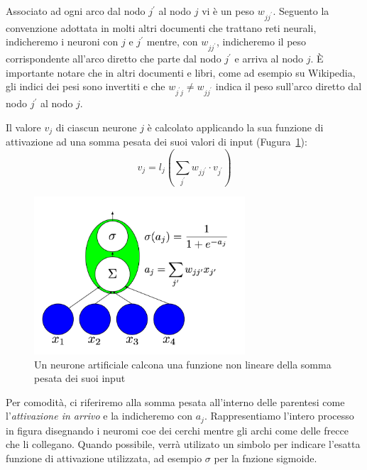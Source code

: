 Associato ad ogni arco dal nodo $j^{'}$ al nodo $j$ vi \`e un peso $w_{jj^{'}}$. Seguento la convenzione adottata in molti altri documenti che trattano reti neurali, indicheremo i neuroni con $j$ e $j^{'}$ mentre, con $w_{jj^{'}}$, indicheremo il peso corrispondente all'arco diretto che parte dal nodo $j^{'}$ e arriva al nodo $j$.
\`E importante notare che in altri documenti e libri, come ad esempio su Wikipedia, gli indici dei pesi sono invertiti e che $w_{j^{'}j} \neq w_{jj^{'}}$ indica il peso sull'arco diretto dal nodo $j^{'}$ al nodo $j$.

Il valore $v_j$ di ciascun neurone $j$ \`e calcolato applicando la sua funzione di attivazione ad una somma pesata dei suoi valori di input (Fugura~\ref{fig:artificialNeuron}): %
\begin{equation} %
  v_j = l_j\left( \sum_{j^{'}} w_{jj^{'}} \cdot v_{j^{'}} \right)
\end{equation}

\begin{figure}[tp]
  \centering
  \begin{center}
    \includegraphics[width=0.7\textwidth]{./images/artificialNeuron.png}
  \end{center}
  \caption{Un neurone artificiale calcona una funzione non lineare della somma pesata dei suoi input}
  \label{fig:artificialNeuron}
\end{figure}
Per comodit\`a, ci riferiremo alla somma pesata all'interno delle parentesi come l'\emph{attivazione in arrivo} e la indicheremo con $a_j$. Rappresentiamo l'intero processo in figura disegnando i neuromi coe dei cerchi mentre gli archi come delle frecce che li collegano.
Quando possibile, verr\`a utilizato un simbolo per indicare l'esatta funzione di attivazione utilizzata, ad esempio $\sigma$ per la fnzione sigmoide.

